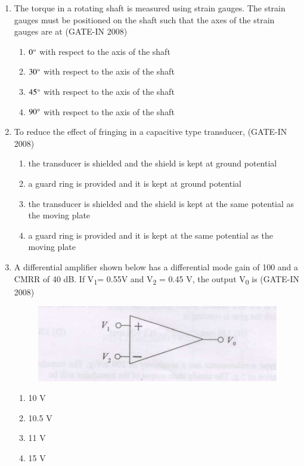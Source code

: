 \documentclass[journal,12pt,onecolumn]{IEEEtran}
\theoremstyle{remark}
\begin{document}
\begin{enumerate}[label=Q.\arabic*,start=1]
    \item The torque in a rotating shaft is measured using strain gauges. The strain gauges must be positioned
on the shaft such that the axes of the strain gauges are at (GATE-IN 2008)
\begin{multicols}{2}
    \begin{enumerate} 
        \item  $0\degree$ with respect to the axis of the shaft 
        \item  $30\degree$ with respect to the axis of the shaft
        \item  $45\degree$ with respect to the axis of the shaft
        \item  $90\degree$ with respect to the axis of the shaft
    \end{enumerate}
    \end{multicols}
    
    \item To reduce the effect of fringing in a capacitive type transducer, (GATE-IN 2008)
    \begin{enumerate} 
        \item  the transducer is shielded and the shield is kept at ground potential  
        \item  a guard ring is provided and it is kept at ground potential  
        \item   the transducer is shielded and the shield is kept at the same potential as the moving plate
        \item a guard ring is provided and it is kept at the same potential as the moving plate
    \end{enumerate}

    \item A differential amplifier shown below has a differential mode gain of 100 and a CMRR of 40 dB. If V\textsubscript{1}= 0.55V  and V\textsubscript{2} = 0.45 V, the output V\textsubscript{0} is (GATE-IN 2008)

 \begin{figure}[H]
    \centering
    \includegraphics[width=0.5\columnwidth]{figs/i18.jpg}
    \caption{}
    \label{fig:placeholder18}
\end{figure}

\begin{multicols}{4}     
    \begin{enumerate} 
        \item 10 V 
        \item 10.5 V
        \item 11 V
        \item 15 V
    \end{enumerate}
    \end{multicols}
    


\end{enumerate}
\end{document}
